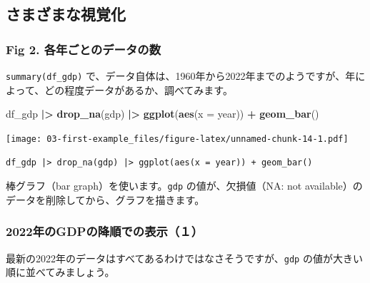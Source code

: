 \documentclass[
  xelatex, ja=standard]{bxjsbook}
\newenvironment{Shaded}{\begin{snugshade}}{\end{snugshade}}
\newcommand{\AttributeTok}[1]{\textcolor[rgb]{0.13,0.29,0.53}{#1}}
\newcommand{\FunctionTok}[1]{\textcolor[rgb]{0.13,0.29,0.53}{\textbf{#1}}}
\newcommand{\NormalTok}[1]{#1}
\newcommand{\SpecialCharTok}[1]{\textcolor[rgb]{0.81,0.36,0.00}{\textbf{#1}}}
\theoremstyle{definition}
\theoremstyle{definition}
\theoremstyle{definition}
\theoremstyle{definition}
\theoremstyle{remark}
\begin{document}
\hypertarget{ux3055ux307eux3056ux307eux306aux8996ux899aux5316}{%
\subsection{さまざまな視覚化}\label{ux3055ux307eux3056ux307eux306aux8996ux899aux5316}}

\hypertarget{fig-2.-ux5404ux5e74ux3054ux3068ux306eux30c7ux30fcux30bfux306eux6570}{%
\subsubsection{Fig 2. 各年ごとのデータの数}\label{fig-2.-ux5404ux5e74ux3054ux3068ux306eux30c7ux30fcux30bfux306eux6570}}

\texttt{summary(df\_gdp)} で、データ自体は、1960年から2022年までのようですが、年によって、どの程度データがあるか、調べてみます。

\begin{Shaded}
\begin{Highlighting}[]
\NormalTok{df\_gdp }\SpecialCharTok{|\textgreater{}} \FunctionTok{drop\_na}\NormalTok{(gdp) }\SpecialCharTok{|\textgreater{}} \FunctionTok{ggplot}\NormalTok{(}\FunctionTok{aes}\NormalTok{(}\AttributeTok{x =}\NormalTok{ year)) }\SpecialCharTok{+} \FunctionTok{geom\_bar}\NormalTok{()}
\end{Highlighting}
\end{Shaded}

\texttt{[image: 03-first-example\_files/figure-latex/unnamed-chunk-14-1.pdf]}

\begin{verbatim}
df_gdp |> drop_na(gdp) |> ggplot(aes(x = year)) + geom_bar()
\end{verbatim}

棒グラフ（bar graph）を使います。\texttt{gdp} の値が、欠損値（NA: not available）のデータを削除してから、グラフを描きます。

\hypertarget{ux5e74ux306egdpux306eux964dux9806ux3067ux306eux8868ux793auxff11}{%
\subsubsection{2022年のGDPの降順での表示（１）}\label{ux5e74ux306egdpux306eux964dux9806ux3067ux306eux8868ux793auxff11}}

最新の2022年のデータはすべてあるわけではなさそうですが、\texttt{gdp} の値が大きい順に並べてみましょう。
\end{document}
